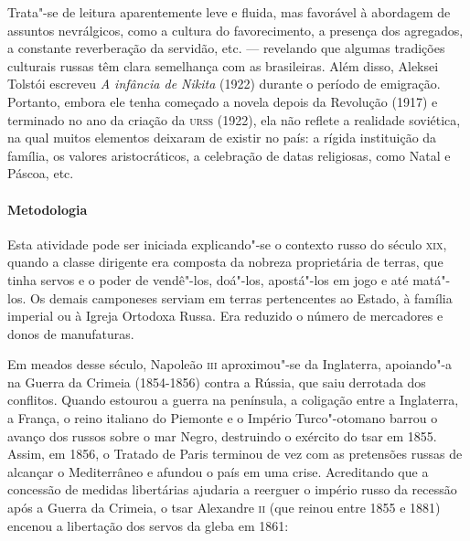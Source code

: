 \documentclass[11pt]{extarticle}
\begin{document}
Trata"-se de leitura aparentemente leve e fluida, mas favorável à
abordagem de assuntos nevrálgicos, como a cultura do favorecimento, a
presença dos agregados, a constante reverberação da servidão, etc. ---
revelando que algumas tradições culturais russas têm clara semelhança
com as brasileiras. Além disso, Aleksei Tolstói escreveu \emph{A
infância de Nikita} (1922) durante o período de emigração. Portanto,
embora ele tenha começado a novela depois da Revolução (1917) e
terminado no ano da criação da \textsc{urss} (1922), ela não reflete a realidade
soviética, na qual muitos elementos deixaram de existir no país: a
rígida instituição da família, os valores aristocráticos, a celebração
de datas religiosas, como Natal e Páscoa, etc.

\paragraph{Metodologia}
Esta atividade pode ser iniciada explicando"-se o contexto russo do
século \textsc{xix}, quando a classe dirigente era composta da nobreza
proprietária de terras, que tinha servos e o poder de vendê"-los,
doá"-los, apostá"-los em jogo e até matá"-los. Os demais camponeses serviam
em terras pertencentes ao Estado, à família imperial ou à Igreja
Ortodoxa Russa. Era reduzido o número de mercadores e donos de
manufaturas.


Em meados desse século, Napoleão \textsc{iii} aproximou"-se da Inglaterra,
apoiando"-a na Guerra da Crimeia (1854-1856) contra a Rússia, que saiu
derrotada dos conflitos. Quando estourou a guerra na península, a
coligação entre a Inglaterra, a França, o reino italiano do Piemonte e o
Império Turco"-otomano barrou o avanço dos russos sobre o mar Negro,
destruindo o exército do tsar em 1855. Assim, em 1856, o Tratado de
Paris terminou de vez com as pretensões russas de alcançar o
Mediterrâneo e afundou o país em uma crise. Acreditando que a concessão
de medidas libertárias ajudaria a reerguer o império russo da recessão
após a Guerra da Crimeia, o tsar Alexandre \textsc{ii} (que reinou entre 1855 e
1881) encenou a libertação dos servos da gleba em 1861:
\end{document}
